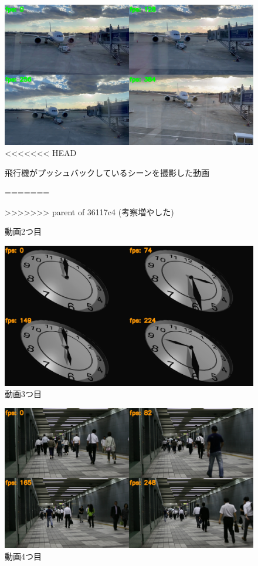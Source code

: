 \documentclass[a4j,12pt,dvipdfmx]{jreport}
\begin{document}
\begin{figure}[H]
  \centering
  \includegraphics[width=13cm]{image/2_result.jpg}
<<<<<<< HEAD
  \caption{飛行機がプッシュバックしているシーンを撮影した動画}
=======
  \caption{動画2つ目}
>>>>>>> parent of 36117c4 (考察増やした)
  \label{fig:movie2}
\end{figure}

\begin{figure}[H]
  \centering
  \includegraphics[width=13cm]{image/3_result.jpg}
  \caption{動画3つ目}
  \label{fig:movie3}
\end{figure}

\begin{figure}[H]
  \centering
  \includegraphics[width=13cm]{image/4_result.jpg}
  \caption{動画4つ目}
  \label{fig:movie4}
\end{figure}
\end{document}
